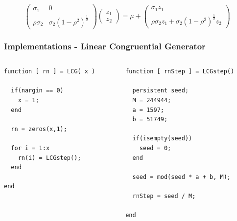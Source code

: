\documentclass[10pt, compress]{beamer}
\begin{document}
\begin{frame}[fragile]
\begin{enumerate}
\[          \left(\begin{matrix} \sigma_1 & 0 \\ \rho\sigma_2 & \sigma_2(1-\rho^2)^{\frac{1}{2}} \end{matrix} \right)
          \left(\begin{matrix} z_1 \\ z_2 \end{matrix} \right) =
        \mu + %
          \left(\begin{matrix} \sigma_1 z_1 \\ \rho\sigma_2z_1+\sigma_2(1-\rho^2)^\frac{1}{2}z_2 \end{matrix} \right)
      \]
  \end{enumerate}
\end{frame}

\begin{frame}[fragile]
	\frametitle{Implementations - Linear Congruential Generator}
	\begin{columns}[t]
		\begin{column}{5cm}
	
			\begin{verbatim}
function [ rn ] = LCG( x ) 

  if(nargin == 0)
    x = 1;
  end
  
  rn = zeros(x,1);
  
  for i = 1:x
    rn(i) = LCGstep();
  end

end
			\end{verbatim}
		\end{column}
		\begin{column}{5cm}
			\begin{verbatim}
function [ rnStep ] = LCGstep()

  persistent seed;
  M = 244944;
  a = 1597;
  b = 51749;
  
  if(isempty(seed))
    seed = 0;
  end
  
  seed = mod(seed * a + b, M);
  
  rnStep = seed / M;

end
			\end{verbatim}
		\end{column}
	\end{columns}
\end{frame}
\end{document}
